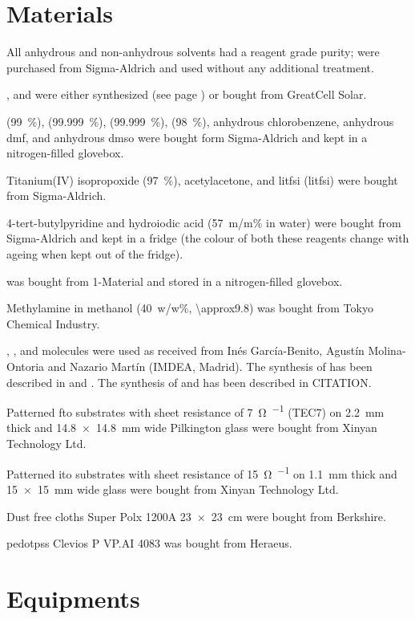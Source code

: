 \section{Materials}

	All anhydrous and non-anhydrous solvents had a reagent grade purity; were purchased from Sigma-Aldrich and used without any additional treatment.

	,  and  were either synthesized (see page \pageref{methods-MAI}) or bought from GreatCell Solar.

	\PbItwo (99~\%), \PbBrtwo (99.999~\%), \CsI (99.999~\%), \PbCltwo (98~\%), anhydrous chlorobenzene, anhydrous \gls{dmf}, and anhydrous \gls{dmso} were bought form Sigma-Aldrich and kept in a nitrogen-filled glovebox.

	Titanium(IV) isopropoxide (97~\%), acetylacetone, and \glsdesc{litfsi} (\gls{litfsi}) were bought from Sigma-Aldrich.

	4-tert-butylpyridine and hydroiodic acid (57~m/m\% in water) were bought from Sigma-Aldrich and kept in a fridge (the colour of both these reagents change with ageing when kept out of the fridge).

	\Spiro was bought from 1-Material and stored in a nitrogen-filled glovebox.

	Methylamine in methanol (40~w/w\%, \SI{\approx9.8}{\Molar}) was bought from Tokyo Chemical Industry.

	, , and  molecules were used as received from Inés García-Benito, Agustín Molina-Ontoria and Nazario Martín (IMDEA, Madrid). The synthesis of  has been described in  and . The synthesis of  and  has been described in CITATION.

	Patterned \gls{fto} substrates with sheet resistance of \SI{7}{\ohm\per\sq} (TEC7) on \SI{2.2}{\mm} thick and \SI{14.8x14.8}{\mm} wide Pilkington glass were bought from Xinyan Technology Ltd.

	Patterned \gls{ito} substrates with sheet resistance of \SI{15}{\ohm\per\sq} on \SI{1.1}{\mm} thick and \SI{15x15}{\mm} wide glass were bought from Xinyan Technology Ltd.

	Dust free cloths Super Polx 1200A \SI{23x23}{\cm} were bought from Berkshire.

	\Gls{pedotpss} Clevios P VP.AI 4083 was bought from Heraeus.
	
\section{Equipments}

